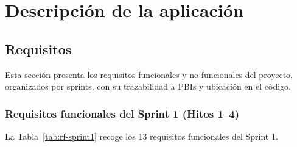 \chapter{Descripción de la aplicación}
\label{cap:descripcion}

\section{Requisitos}
\label{sec:requisitos}

Esta sección presenta los requisitos funcionales y no funcionales del proyecto, organizados por sprints, con su trazabilidad a PBIs y ubicación en el código.

\subsection{Requisitos funcionales del Sprint 1 (Hitos 1--4)}
\label{sec:rf-sprint1}

La Tabla~\ref{tab:rf-sprint1} recoge los 13 requisitos funcionales del Sprint 1.

